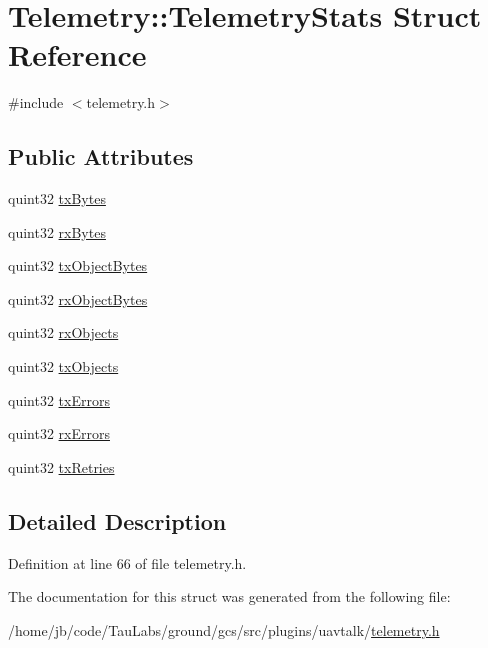 \hypertarget{struct_telemetry_1_1_telemetry_stats}{\section{\-Telemetry\-:\-:\-Telemetry\-Stats \-Struct \-Reference}
\label{struct_telemetry_1_1_telemetry_stats}
}


{\ttfamily \#include $<$telemetry.\-h$>$}

\subsection*{\-Public \-Attributes}
\begin{DoxyCompactItemize}
\item 
quint32 \hyperlink{group___u_a_v_talk_plugin_ga349d8c0f2aac815d79b13e54f818658c}{tx\-Bytes}
\item 
quint32 \hyperlink{group___u_a_v_talk_plugin_gadda927fbb6858f5e60b6daf16d5bc94e}{rx\-Bytes}
\item 
quint32 \hyperlink{group___u_a_v_talk_plugin_ga5c315107de95913671e9bd51ce699e1f}{tx\-Object\-Bytes}
\item 
quint32 \hyperlink{group___u_a_v_talk_plugin_ga495b5acf35424dbdf221e81f0024ae92}{rx\-Object\-Bytes}
\item 
quint32 \hyperlink{group___u_a_v_talk_plugin_gacd544f271fc6ee0f5eb72dc101a23c21}{rx\-Objects}
\item 
quint32 \hyperlink{group___u_a_v_talk_plugin_gaa7970a8185efea335e5cbe734739eca9}{tx\-Objects}
\item 
quint32 \hyperlink{group___u_a_v_talk_plugin_gad6930d8f0e5a3c2e251c9600d1264c1a}{tx\-Errors}
\item 
quint32 \hyperlink{group___u_a_v_talk_plugin_gaf07e5e11a7f3b4c277a26fa5dba7d3fa}{rx\-Errors}
\item 
quint32 \hyperlink{group___u_a_v_talk_plugin_ga071780b1d6a06aa36a41efaa190e97ec}{tx\-Retries}
\end{DoxyCompactItemize}


\subsection{\-Detailed \-Description}


\-Definition at line 66 of file telemetry.\-h.



\-The documentation for this struct was generated from the following file\-:\begin{DoxyCompactItemize}
\item 
/home/jb/code/\-Tau\-Labs/ground/gcs/src/plugins/uavtalk/\hyperlink{telemetry_8h}{telemetry.\-h}\end{DoxyCompactItemize}
